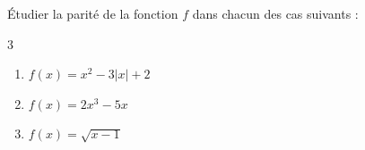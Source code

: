 \begin{Application}[][10 min]
Étudier la parité de la fonction $f$ dans chacun des cas suivants :
\begin{multicols}{3}
    \begin{enumerate}
    \item $f(x) = x^2 - 3|x| + 2$
    \item $f(x) = 2x^3 - 5x$
    \item $f(x) = \sqrt{x - 1}$
\end{enumerate}
\end{multicols}
\end{Application}
